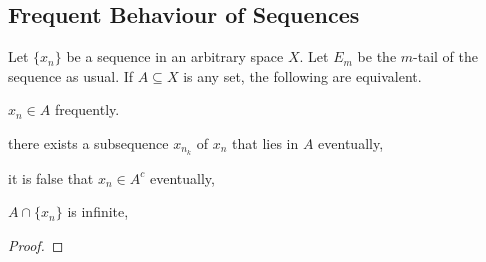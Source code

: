 \documentclass[../../main.tex]{subfiles}
\begin{document}
\providecommand{\xn}{\{x_n\}}
\subsection{Frequent Behaviour of Sequences}
\begin{wts}
    Let $\xn$ be a sequence in an arbitrary space $X$. Let $E_m$ be the $m$-tail of the sequence as usual. If $A\subseteq X$ is any set, the following are equivalent.
    \begin{enumalpha}
        \item $x_n\in A$ frequently.
        \item there exists a subsequence $x_{n_k}$ of $x_n$ that lies in $A$ eventually,
        \item it is false that $x_n\in A^c$ eventually,
        \item $A\cap \{x_n\}$ is infinite,
    \end{enumalpha}
\end{wts}
\begin{proof}

\end{proof}
\end{document}
